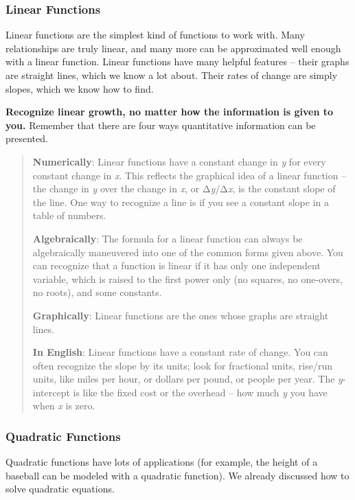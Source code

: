\subsubsection{Linear Functions}\label{linear-functions}

Linear functions are the simplest kind of functions to work with. Many
relationships are truly linear, and many more can be approximated well
enough with a linear function. Linear functions have many helpful
features -- their graphs are straight lines, which we know a lot about.
Their rates of change are simply slopes, which we know how to find.

\textbf{Recognize linear growth, no matter how the information is given
to you.} Remember that there are four ways quantitative information can
be presented.

\begin{quote}
\textbf{Numerically}: Linear functions have a constant change in
\emph{y} for every constant change in \emph{x}. This reflects the
graphical idea of a linear function -- the change in \emph{y} over the
change in \emph{x}, or Δ\emph{y}/Δ\emph{x}, is the constant slope of the
line. One way to recognize a line is if you see a constant slope in a
table of numbers.

\textbf{Algebraically}: The formula for a linear function can always be
algebraically maneuvered into one of the common forms given above. You
can recognize that a function is linear if it has only one independent
variable, which is raised to the first power only (no squares, no
one-overs, no roots), and some constants.

\textbf{Graphically}: Linear functions are the ones whose graphs are
straight lines.

\textbf{In English}: Linear functions have a constant rate of change.
You can often recognize the slope by its units; look for fractional
units, rise/run units, like miles per hour, or dollars per pound, or
people per year. The \emph{y}-intercept is like the fixed cost or the
overhead -- how much \emph{y} you have when \emph{x} is zero.
\end{quote}

\subsubsection{Quadratic Functions}\label{quadratic-functions}

Quadratic functions have lots of applications (for example, the height
of a baseball can be modeled with a quadratic function). We already
discussed how to solve quadratic equations.

